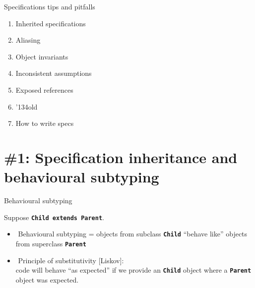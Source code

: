\documentclass[
pdf,
nocolorBG,
slideColor,
cok,
]{prosper}
\title{\embf{\blue        {\huge Specification tips and pitfalls }}      }
\author{\embf{\Large{\red David Cok, Joe Kiniry, and Erik Poll}}
       }
\newcommand{\code}[1]{{\rm \texttt{\textbf{\small #1}}}}
\newcommand{\bsl}{\char'134}
\newcommand{\old}{\bsl old}
\begin{document}
\maketitle \boldmath



\begin{slide}{Specifications tips and pitfalls}
\begin{enumerate}
\item Inherited specifications 
\item Aliasing
\item Object invariants
\item Inconsistent assumptions
\item Exposed references
\item \old
\item How to write specs
\end{enumerate}

\end{slide}


\part{{\Large \red \#1: Specification inheritance and behavioural subtyping }}




\begin{slide}{Behavioural subtyping}
\vspace*{-3ex}

Suppose \code{Child extends Parent}.

\begin{itemize}
\item $\!$ {\green Behavioural subtyping} =
objects from subclass \code{Child} ``behave like''
objects from superclass \code{Parent}
\item $\!$ {\green Principle of substitutivity} [Liskov]:\\
code will behave ``as expected'' if we provide an 
\code{Child} object where a \code{Parent} object was expected.
\end{itemize}

\end{slide}
\end{document}
